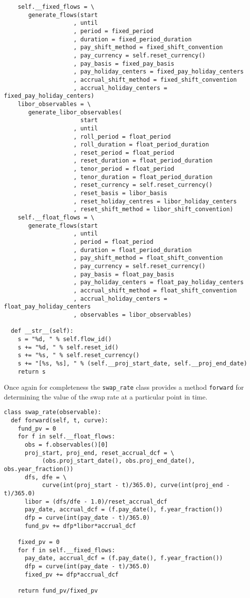 \begin{verbatim}
    self.__fixed_flows = \
       generate_flows(start
                    , until
                    , period = fixed_period
                    , duration = fixed_period_duration
                    , pay_shift_method = fixed_shift_convention
                    , pay_currency = self.reset_currency()
                    , pay_basis = fixed_pay_basis
                    , pay_holiday_centers = fixed_pay_holiday_centers
                    , accrual_shift_method = fixed_shift_convention
                    , accrual_holiday_centers = fixed_pay_holiday_centers)
    libor_observables = \
       generate_libor_observables(
                      start
                    , until
                    , roll_period = float_period
                    , roll_duration = float_period_duration
                    , reset_period = float_period
                    , reset_duration = float_period_duration
                    , tenor_period = float_period
                    , tenor_duration = float_period_duration
                    , reset_currency = self.reset_currency()
                    , reset_basis = libor_basis
                    , reset_holiday_centres = libor_holiday_centers
                    , reset_shift_method = libor_shift_convention)
    self.__float_flows = \
       generate_flows(start
                    , until
                    , period = float_period
                    , duration = float_period_duration
                    , pay_shift_method = float_shift_convention
                    , pay_currency = self.reset_currency()
                    , pay_basis = float_pay_basis
                    , pay_holiday_centers = float_pay_holiday_centers
                    , accrual_shift_method = float_shift_convention
                    , accrual_holiday_centers = float_pay_holiday_centers
                    , observables = libor_observables)

  def __str__(self):
    s = "%d, " % self.flow_id()
    s += "%d, " % self.reset_id()
    s += "%s, " % self.reset_currency()
    s += "[%s, %s], " % (self.__proj_start_date, self.__proj_end_date)
    return s
\end{verbatim}
Once again for completeness the \verb|swap_rate| class provides a method \verb|forward| 
for determining the value of the swap rate at a particular point in time.
\begin{verbatim}
class swap_rate(observable):
  def forward(self, t, curve):
    fund_pv = 0
    for f in self.__float_flows:
      obs = f.observables()[0]
      proj_start, proj_end, reset_accrual_dcf = \
           (obs.proj_start_date(), obs.proj_end_date(), obs.year_fraction())
      dfs, dfe = \
           curve(int(proj_start - t)/365.0), curve(int(proj_end - t)/365.0)
      libor = (dfs/dfe - 1.0)/reset_accrual_dcf
      pay_date, accrual_dcf = (f.pay_date(), f.year_fraction())
      dfp = curve(int(pay_date - t)/365.0)
      fund_pv += dfp*libor*accrual_dcf

    fixed_pv = 0
    for f in self.__fixed_flows:
      pay_date, accrual_dcf = (f.pay_date(), f.year_fraction())
      dfp = curve(int(pay_date - t)/365.0)
      fixed_pv += dfp*accrual_dcf

    return fund_pv/fixed_pv
\end{verbatim}
